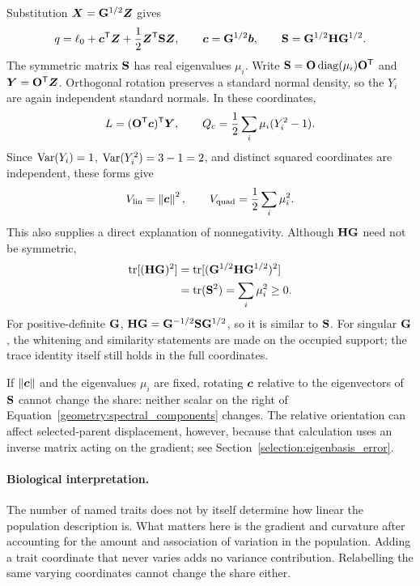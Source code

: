 Substitution $\boldsymbol{X}=\mathbf{G}^{1/2}\boldsymbol{Z}$ gives
\begin{equation}
q=\ell_0+\boldsymbol{c}^{\mathsf T}\boldsymbol{Z}
              +\frac12\boldsymbol{Z}^{\mathsf T}\mathbf{S}\boldsymbol{Z},
\qquad
\boldsymbol{c}=\mathbf{G}^{1/2}\boldsymbol{b},
\qquad
\mathbf{S}=\mathbf{G}^{1/2}\mathbf{H}\mathbf{G}^{1/2}.
\label{geometry:whitened_coefficients}
\end{equation}
The symmetric matrix $\mathbf{S}$ has real eigenvalues $\mu_i$. Write
$\mathbf{S}=\mathbf{O}\operatorname{diag}(\mu_i)\mathbf{O}^{\mathsf T}$ and
$\boldsymbol{Y}=\mathbf{O}^{\mathsf T}\boldsymbol{Z}$. Orthogonal rotation preserves a
standard normal density, so the $Y_i$ are again independent standard
normals. In these coordinates,
\begin{equation}
L=(\mathbf{O}^{\mathsf T}\boldsymbol{c})^{\mathsf T}\boldsymbol{Y},
\qquad
Q_c=\frac12\sum_i\mu_i(Y_i^2-1).
\end{equation}
Since $\operatorname{Var}(Y_i)=1$, $\operatorname{Var}(Y_i^2)=3-1=2$, and distinct squared
coordinates are independent, these forms give
\begin{equation}
V_{\mathrm{lin}}=\left\lVert \boldsymbol{c}\right\rVert^2,
\qquad
V_{\mathrm{quad}}=\frac12\sum_i\mu_i^2.
\label{geometry:spectral_components}
\end{equation}
This also supplies a direct explanation of nonnegativity. Although
$\mathbf{H}\mathbf{G}$ need not be symmetric,
\begin{align}
\operatorname{tr}[(\mathbf{H}\mathbf{G})^2]
 &=\operatorname{tr}[(\mathbf{G}^{1/2}\mathbf{H}\mathbf{G}^{1/2})^2]\nonumber\\
 &=\operatorname{tr}(\mathbf{S}^2)=\sum_i\mu_i^2\geq0.
\end{align}
For positive-definite $\mathbf{G}$,
$\mathbf{H}\mathbf{G}=\mathbf{G}^{-1/2}\mathbf{S}\mathbf{G}^{1/2}$, so it is similar
to $\mathbf{S}$. For singular $\mathbf{G}$, the whitening and similarity
statements are made on the occupied support; the trace identity itself
still holds in the full coordinates.

If $\left\lVert \boldsymbol{c}\right\rVert$ and the eigenvalues $\mu_i$ are fixed, rotating
$\boldsymbol{c}$ relative to the eigenvectors of $\mathbf{S}$ cannot change the
share: neither scalar on the right of
Equation~\eqref{geometry:spectral_components} changes. The relative
orientation can affect selected-parent displacement, however, because
that calculation uses an inverse matrix acting on the gradient; see
Section~\ref{selection:eigenbasis_error}.

\paragraph{Biological interpretation.}
The number of named traits does not by itself determine how linear the
population description is. What matters here is the gradient and
curvature after accounting for the amount and association of variation in
the population. Adding a trait coordinate that never varies adds no
variance contribution. Relabelling the same varying coordinates cannot
change the share either.

